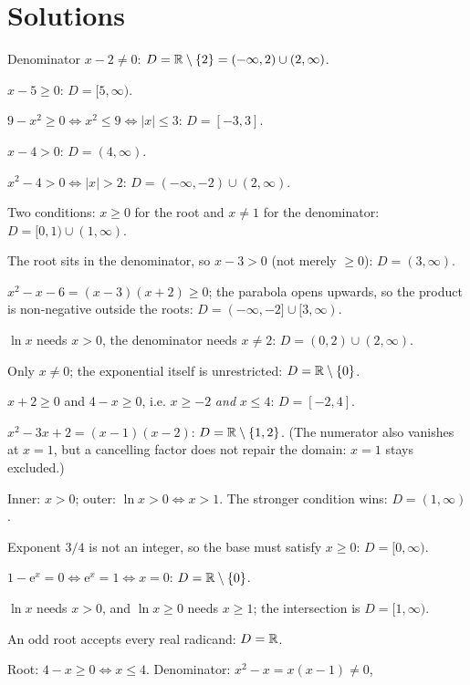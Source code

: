 \section{Solutions}

\begin{solutions}
  \item Denominator $x-2\neq0$: \;$D=\mathbb{R}\setminus\{2\}
        =(-\infty,2)\cup(2,\infty)$.
  \item $x-5\geq0$: \;$D=[5,\infty)$.
  \item $9-x^{2}\geq0\iff x^{2}\leq9\iff|x|\leq3$: \;$D=[-3,3]$.
  \item $x-4>0$: \;$D=(4,\infty)$.
  \item $x^{2}-4>0\iff|x|>2$: \;$D=(-\infty,-2)\cup(2,\infty)$.
  \item Two conditions: $x\geq0$ for the root and $x\neq1$ for the
        denominator: \;$D=[0,1)\cup(1,\infty)$.
  \item The root sits in the denominator, so $x-3>0$ (not merely
        $\geq0$): \;$D=(3,\infty)$.
  \item $x^{2}-x-6=(x-3)(x+2)\geq0$; the parabola opens upwards, so the
        product is non-negative outside the roots:
        \;$D=(-\infty,-2]\cup[3,\infty)$.
  \item $\ln x$ needs $x>0$, the denominator needs $x\neq2$:
        \;$D=(0,2)\cup(2,\infty)$.
  \item Only $x\neq0$; the exponential itself is unrestricted:
        \;$D=\mathbb{R}\setminus\{0\}$.
  \item $x+2\geq0$ and $4-x\geq0$, i.e. $x\geq-2$ \emph{and} $x\leq4$:
        \;$D=[-2,4]$.
  \item $x^{2}-3x+2=(x-1)(x-2)$: \;$D=\mathbb{R}\setminus\{1,2\}$. (The numerator
        also vanishes at $x=1$, but a cancelling factor does not repair the
        domain: $x=1$ stays excluded.)
  \item Inner: $x>0$; outer: $\ln x>0\iff x>1$. The stronger condition
        wins: \;$D=(1,\infty)$.
  \item Exponent $3/4$ is not an integer, so the base must satisfy
        $x\geq0$: \;$D=[0,\infty)$.
  \item $1-\mathrm{e}^{x}=0\iff \mathrm{e}^{x}=1\iff x=0$:
        \;$D=\mathbb{R}\setminus\{0\}$.
  \item $\ln x$ needs $x>0$, and $\ln x\geq0$ needs $x\geq1$; the
        intersection is \;$D=[1,\infty)$.
  \item An odd root accepts every real radicand: \;$D=\mathbb{R}$.
  \item Root: $4-x\geq0\iff x\leq4$. Denominator: $x^{2}-x=x(x-1)\neq0$,

\end{solutions}
